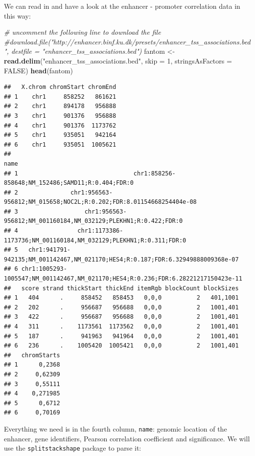 \documentclass[9pt,a4paper,]{extarticle}
\newenvironment{Shaded}{\begin{snugshade}}{\end{snugshade}}
\newcommand{\KeywordTok}[1]{\textcolor[rgb]{0.13,0.29,0.53}{\textbf{#1}}}
\newcommand{\DataTypeTok}[1]{\textcolor[rgb]{0.13,0.29,0.53}{#1}}
\newcommand{\DecValTok}[1]{\textcolor[rgb]{0.00,0.00,0.81}{#1}}
\newcommand{\StringTok}[1]{\textcolor[rgb]{0.31,0.60,0.02}{#1}}
\newcommand{\CommentTok}[1]{\textcolor[rgb]{0.56,0.35,0.01}{\textit{#1}}}
\newcommand{\OtherTok}[1]{\textcolor[rgb]{0.56,0.35,0.01}{#1}}
\newcommand{\NormalTok}[1]{#1}
\begin{document}
We can read in and have a look at the enhancer - promoter correlation data in this way:

\begin{Shaded}
\begin{Highlighting}[]
\CommentTok{# uncomment the following line to download the file}
\CommentTok{#download.file("http://enhancer.binf.ku.dk/presets/enhancer_tss_associations.bed", destfile = "enhancer_tss_associations.bed")}
\NormalTok{fantom <-}\StringTok{ }\KeywordTok{read.delim}\NormalTok{(}\StringTok{"enhancer_tss_associations.bed"}\NormalTok{, }\DataTypeTok{skip =} \DecValTok{1}\NormalTok{, }\DataTypeTok{stringsAsFactors =} \OtherTok{FALSE}\NormalTok{)}
\KeywordTok{head}\NormalTok{(fantom)}
\end{Highlighting}
\end{Shaded}

\begin{verbatim}
##   X.chrom chromStart chromEnd
## 1    chr1     858252   861621
## 2    chr1     894178   956888
## 3    chr1     901376   956888
## 4    chr1     901376  1173762
## 5    chr1     935051   942164
## 6    chr1     935051  1005621
##                                                                                name
## 1                                 chr1:858256-858648;NM_152486;SAMD11;R:0.404;FDR:0
## 2               chr1:956563-956812;NM_015658;NOC2L;R:0.202;FDR:8.01154668254404e-08
## 3                   chr1:956563-956812;NM_001160184,NM_032129;PLEKHN1;R:0.422;FDR:0
## 4                 chr1:1173386-1173736;NM_001160184,NM_032129;PLEKHN1;R:0.311;FDR:0
## 5   chr1:941791-942135;NM_001142467,NM_021170;HES4;R:0.187;FDR:6.32949888009368e-07
## 6 chr1:1005293-1005547;NM_001142467,NM_021170;HES4;R:0.236;FDR:6.28221217150423e-11
##   score strand thickStart thickEnd itemRgb blockCount blockSizes
## 1   404      .     858452   858453   0,0,0          2   401,1001
## 2   202      .     956687   956688   0,0,0          2   1001,401
## 3   422      .     956687   956688   0,0,0          2   1001,401
## 4   311      .    1173561  1173562   0,0,0          2   1001,401
## 5   187      .     941963   941964   0,0,0          2   1001,401
## 6   236      .    1005420  1005421   0,0,0          2   1001,401
##   chromStarts
## 1      0,2368
## 2     0,62309
## 3     0,55111
## 4    0,271985
## 5      0,6712
## 6     0,70169
\end{verbatim}

Everything we need is in the fourth column, \texttt{name}: genomic location of the enhancer, gene identifiers, Pearson correlation coefficient and significance.
We will use the \texttt{splitstackshape} package \citep{Mahto2014} to parse it:
\end{document}
